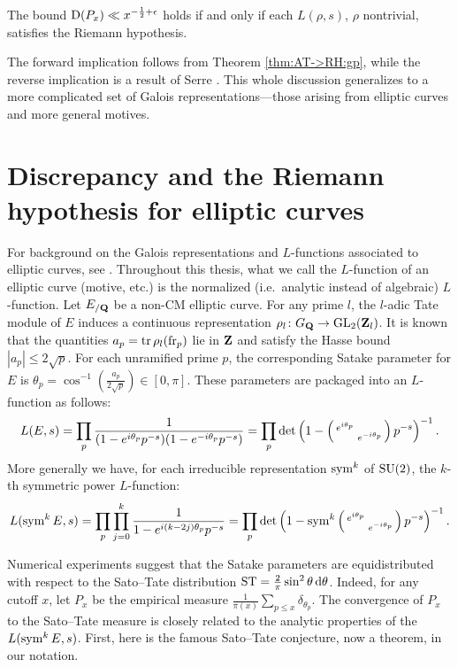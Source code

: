 \begin{theorem}
The bound $\operatorname{D}(P_x) \ll x^{-\frac 1 2+\epsilon}$ holds if and only if each
$L(\rho,s)$, $\rho$ nontrivial, satisfies the Riemann hypothesis. 
\end{theorem}

The forward implication follows from Theorem \ref{thm:AT->RH:gp}, while the reverse implication is a result of Serre \cite[Th.~4]{serre-1981}. 
This whole discussion generalizes to a more complicated set of Galois 
representations---those arising from elliptic curves and more general motives.  





\section{Discrepancy and the Riemann hypothesis for elliptic curves}

For background on the Galois representations and $L$-functions associated to 
elliptic curves, see \cite[III\S7, C\S17]{silverman-2009}. Throughout this 
thesis, what we call the $L$-function of an elliptic curve (motive, etc.) is 
the normalized (i.e.~analytic instead of algebraic) $L$-function. 
Let $E_{/\mathbf{Q}}$ be a non-CM elliptic curve. For any prime $l$, the $l$-adic Tate 
module of $E$ induces a continuous representation 
$\rho_l \colon G_{\mathbf{Q}} \to \operatorname{GL}_2(\mathbf{Z}_l)$. It is known that the quantities 
$a_p = \operatorname{tr} \rho_l(\mathrm{fr}_p)$ lie in $\mathbf{Z}$ and satisfy the Hasse bound 
$|a_p| \leqslant 2\sqrt p$. For each unramified prime $p$, the 
corresponding Satake parameter for $E$ is 
$\theta_p = \cos^{-1}\left(\frac{a_p}{2\sqrt p}\right) \in [0,\pi]$. 
These parameters are packaged into an $L$-function as follows:
\[
	L(E,s) = \prod_p \frac{1}{(1 - e^{i \theta_p} p^{-s})(1- e^{-i \theta_p} p^{-s})} = \prod_p \det\left(1 - \left(\begin{smallmatrix} e^{i\theta_p} &  \\  & e^{-i \theta_p} \end{smallmatrix}\right)p^{-s}\right)^{-1}.
\]
More generally we have, for each irreducible representation $\operatorname{sym}^k$ of 
$\operatorname{SU}(2)$, the $k$-th symmetric power $L$-function: 
\[
	L(\operatorname{sym}^k E, s) = \prod_p \prod_{j=0}^k \frac{1}{1 - e^{i (k - 2j) \theta_p} p^{-s}} = \prod_p \det\left(1-\operatorname{sym}^k \left(\begin{smallmatrix} e^{i\theta_p} &  \\  & e^{-i \theta_p} \end{smallmatrix}\right)p^{-s}\right)^{-1}.
\]

Numerical experiments suggest that the Satake parameters are equidistributed 
with respect to the Sato--Tate distribution 
$\mathrm{ST} = \frac{2}{\pi} \sin^2\theta\, \mathrm{d}\theta$. Indeed, for any cutoff $x$, let 
$P_x$ be the empirical measure 
$\frac{1}{\pi(x)} \sum_{p\leqslant x} \delta_{\theta_p}$. 
The convergence of $P_x$ to the Sato--Tate measure is closely related to 
the analytic properties of the $L(\operatorname{sym}^k E,s)$. First, here is the famous 
Sato--Tate conjecture, now a theorem, in our notation. 

